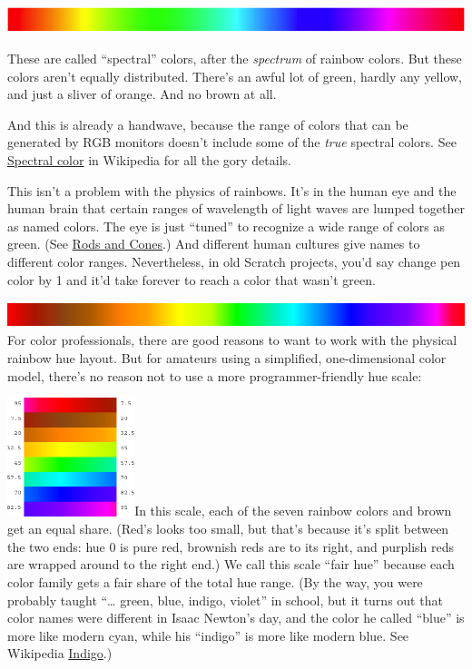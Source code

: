 \includegraphics[width=5.80667in,height=0.30667in]{media/image1189.png}

These are called ``spectral'' colors, after the \emph{spectrum} of
rainbow colors. But these colors aren't equally distributed. There's an
awful lot of green, hardly any yellow, and just a sliver of orange. And
no brown at all.

And this is already a handwave, because the range of colors that can be
generated by RGB monitors doesn't include some of the \emph{true}
spectral colors. See
\href{https://en.wikipedia.org/wiki/Spectral_color}{Spectral color} in
Wikipedia for all the gory details.

This isn't a problem with the physics of rainbows. It's in the human eye
and the human brain that certain ranges of wavelength of light waves are
lumped together as named colors. The eye is just ``tuned'' to recognize
a wide range of colors as green. (See
\href{https://en.wikipedia.org/w/index.php?title=Rods_and_cones}{Rods
and Cones}.) And different human cultures give names to different color
ranges. Nevertheless, in old Scratch projects, you'd say change pen
color by 1 and it'd take forever to reach a color that wasn't green.

\includegraphics[width=5.99444in,height=0.29931in]{media/image1190.png}For
color professionals, there are good reasons to want to work with the
physical rainbow hue layout. But for amateurs using a simplified,
one-dimensional color model, there's no reason not to use a more
programmer-friendly hue scale:

\includegraphics[width=1.45972in,height=1.35833in]{media/image1191.png}In
this scale, each of the seven rainbow colors and brown get an equal
share. (Red's looks too small, but that's because it's split between the
two ends: hue 0 is pure red, brownish reds are to its right, and
purplish reds are wrapped around to the right end.) We call this scale
``fair hue'' because each color family gets a fair share of the total
hue range. (By the way, you were probably taught ``\ldots{} green, blue,
indigo, violet'' in school, but it turns out that color names were
different in Isaac Newton's day, and the color he called ``blue'' is
more like modern cyan, while his ``indigo'' is more like modern blue.
See Wikipedia \href{https://en.wikipedia.org/wiki/Indigo}{Indigo}.)

